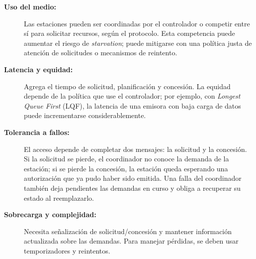 \documentclass[11pt,a4paper]{article}
\begin{document}
\begin{itemize}
\begin{description}
    \item[\textbf{Uso del medio:}] Las estaciones pueden ser coordinadas por el controlador o competir entre sí para solicitar recursos, según el protocolo. Esta competencia puede aumentar el riesgo de \textit{starvation}; puede mitigarse con una política justa de atención de solicitudes o mecanismos de reintento.
    \item[\textbf{Latencia y equidad:}] Agrega el tiempo de solicitud, planificación y concesión. La equidad depende de la política que use el controlador; por ejemplo, con \textit{Longest Queue First} (LQF), la latencia de una emisora con baja carga de datos puede incrementarse considerablemente.
    \item[\textbf{Tolerancia a fallos:}] El acceso depende de completar dos mensajes: la solicitud y la concesión. Si la solicitud se pierde, el coordinador no conoce la demanda de la estación; si se pierde la concesión, la estación queda esperando una autorización que ya pudo haber sido emitida. Una falla del coordinador también deja pendientes las demandas en curso y obliga a recuperar su estado al reemplazarlo.
    \item[\textbf{Sobrecarga y complejidad:}] Necesita señalización de solicitud/concesión y mantener información actualizada sobre las demandas. Para manejar pérdidas, se deben usar temporizadores y reintentos.
  \end{description}
\end{itemize}
\end{document}
